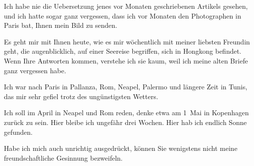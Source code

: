 \pstart
           Ich habe nie die Uebersetzung jenes vor Monaten geschriebenen Artikels gesehen, und ich hatte sogar ganz
               vergessen, dass ich vor Monaten den Photographen in Paris
               bat, Ihnen mein Bild\pwindex{?? [Fotograf in Paris] *~1912@\textsc{?? [Fotograf in Paris]} (*~1912)!Georg Brandes]@\strich\emph{[Georg Brandes]}|pwv} zu
               senden.\pend
           
\pstart
           Es geht mir mit Ihnen heute, wie es mir wöchentlich mit meiner liebsten Freundin geht, die
               augenblicklich, auf einer Seereise begriffen, sich in Hongkong befindet. Wenn Ihre Antworten kommen, verstehe ich sie
               kaum, weil ich meine alten Briefe ganz vergessen habe.\pend
           
\pstart
           Ich war nach Paris in Pallanza, Rom, Neapel, Palermo und längere Zeit in Tunis, das
               mir sehr gefiel trotz des ungünstigsten Wetters.\pend
           
\pstart
           Ich soll im April in Neapel und Rom reden, denke etwa am 1 Mai in Kopenhagen zurück zu sein. Hier bleibe ich
               ungefähr {\pb}drei Wochen. Hier hab
               ich endlich Sonne gefunden.\pend
           
\pstart
           Habe ich mich auch unrichtig ausgedrückt, können Sie wenigstens nicht meine
               freundschaftliche Gesinnung bezweifeln.\pend
           
